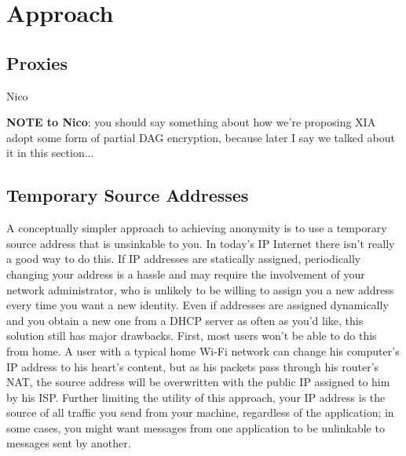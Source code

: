 \documentclass{article}
\begin{document}
\section{Approach}
\label{approach}

\subsection{Proxies}
\label{proxies}
Nico

{\bf NOTE to Nico}: you should say something about how we're proposing XIA adopt some form of partial DAG encryption, because later I say we talked about it in this section...

\subsection{Temporary Source Addresses}
A conceptually simpler approach to achieving anonymity is to use a temporary source address that is unsinkable to you. In today's IP Internet there isn't really a good way to do this. If IP addresses are statically assigned, periodically changing your address is a hassle and may require the involvement of your network administrator, who is unlikely to be willing to assign you a new address every time you want a new identity. Even if addresses are assigned dynamically and you obtain a new one from a DHCP server as often as you'd like, this solution still has major drawbacks. First, most users won't be able to do this from home. A user with a typical home Wi-Fi network can change his computer's IP address to his heart's content, but as his packets pass through his router's NAT, the source address will be overwritten with the public IP assigned to him by his ISP. Further limiting the utility of this approach, your IP address is the source of all traffic you send from your machine, regardless of the application; in some cases, you might want messages from one application to be unlinkable to messages sent by another.
\end{document}
